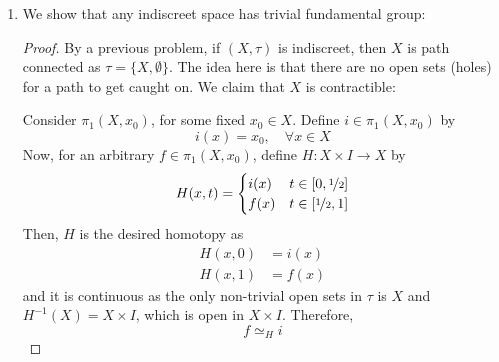 \documentclass{book}
\begin{document}
\begin{enumerate}[(1)]
    \item We show that any indiscreet space has trivial fundamental group: 
        \begin{proof} By a previous problem, if $(X, \tau)$ is indiscreet, then $X$ is path connected as $\tau = \{X, \emptyset\}$. The idea here is that there are no open sets (holes) for a path to get caught on. We claim that $X$ is contractible: 
            \par Consider $\pi_1(X, x_0)$, for some fixed $x_0 \in X$. Define $i \in \pi_1(X, x_0)$ by 
            \[i(x) = x_0, \quad \forall x \in X\]
            Now, for an arbitrary $f \in \pi_1(X, x_0)$, define $H: X \times I \rightarrow X$ by 
            \[H(x,t) =
            \begin{cases}
                i(x) & t \in [0,\nicefrac{1}{2}] \\
                f(x) & t \in [\nicefrac{1}{2}, 1]
            \end{cases}
            \]
            Then, $H$ is the desired homotopy as 
            \begin{align*}
                H(x,0) & = i(x) \\
                H(x,1) & = f(x)
            \end{align*}
            and it is continuous as the only non-trivial open sets in $\tau $ is $X$ and $H^{-1}(X) = X \times I$, which is open in $X \times I$. Therefore, 
            \[f \simeq_H i \]
        \end{proof}


\end{enumerate}
\end{document}
